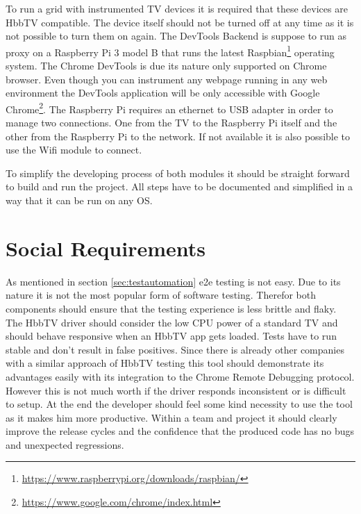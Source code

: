 To run a grid with instrumented TV devices it is required that these devices are HbbTV
compatible. The device itself should not be turned off at any time as it is not possible
to turn them on again. The DevTools Backend is suppose to run as proxy on a Raspberry Pi 3
model B that runs the latest Raspbian\footnote{\url{https://www.raspberrypi.org/downloads/raspbian/}}
operating system. The Chrome DevTools is due its nature only supported on Chrome browser.
Even though you can instrument any webpage running in any web environment the DevTools
application will be only accessible with Google Chrome\footnote{\url{https://www.google.com/chrome/index.html}}.
The Raspberry Pi requires an ethernet to USB adapter in order to manage two connections.
One from the TV to the Raspberry Pi itself and the other from the Raspberry Pi to the network.
If not available it is also possible to use the Wifi module to connect.

To simplify the developing process of both modules it should be straight forward to build
and run the project. All steps have to be documented and simplified in a way that it can
be run on any OS.

\section{Social Requirements\label{sec:socreq}}

As mentioned in section \ref{sec:testautomation} e2e testing is not easy. Due to its nature it
is not the most popular form of software testing. Therefor both components should ensure that
the testing experience is less brittle and flaky. The HbbTV driver should consider the low
CPU power of a standard TV and should behave responsive when an HbbTV app gets loaded. Tests
have to run stable and don't result in false positives. Since there is already other companies
with a similar approach of HbbTV testing this tool should demonstrate its advantages easily
with its integration to the Chrome Remote Debugging protocol. However this is not much worth
if the driver responds inconsistent or is difficult to setup. At the end the developer should
feel some kind necessity to use the tool as it makes him more productive. Within a team and
project it should clearly improve the release cycles and the confidence that the produced code
has no bugs and unexpected regressions.
